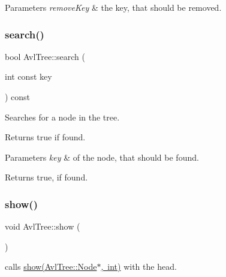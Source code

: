 \begin{DoxyParams}{Parameters}
{\em remove\+Key} & the key, that should be removed. \\
\hline
\end{DoxyParams}
\mbox{\label{class_avl_tree_a62f478c45b1505e637617a5a8edb9374}} 
\subsubsection{\texorpdfstring{search()}{search()}}
{\footnotesize\ttfamily bool Avl\+Tree\+::search (\begin{DoxyParamCaption}\item[{int const}]{key }\end{DoxyParamCaption}) const}

Searches for a node in the tree. \begin{DoxyReturn}{Returns}
true if found.
\end{DoxyReturn}

\begin{DoxyParams}{Parameters}
{\em key} & of the node, that should be found. \\
\hline
\end{DoxyParams}
\begin{DoxyReturn}{Returns}
true, if found. 
\end{DoxyReturn}
\mbox{\label{class_avl_tree_a0c18b4848eb2a6d5876afb6ea203b7f1}} 
\subsubsection{\texorpdfstring{show()}{show()}\hspace{0.1cm}{\footnotesize\ttfamily [1/2]}}
{\footnotesize\ttfamily void Avl\+Tree\+::show (\begin{DoxyParamCaption}{ }\end{DoxyParamCaption})}



calls \mbox{\hyperlink{class_avl_tree_ab468a9e24161484f610c4193256d4f00}{show(\+Avl\+Tree\+::\+Node$\ast$, int)}} with the head. 

\mbox{\label{class_avl_tree_ab468a9e24161484f610c4193256d4f00}} 
